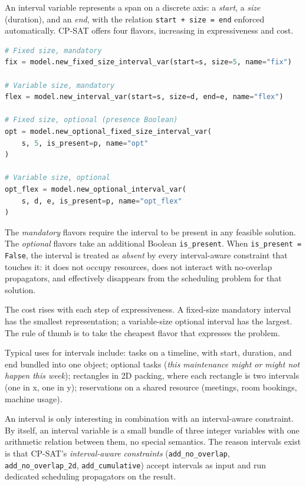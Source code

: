 An interval variable represents a span on a discrete axis: a
\emph{start}, a \emph{size} (duration), and an \emph{end}, with the
relation \lstinline!start + size = end! enforced
automatically. CP-SAT offers four flavors, increasing in expressiveness
and cost.

\begin{lstlisting}[language=Python]
# Fixed size, mandatory
fix = model.new_fixed_size_interval_var(start=s, size=5, name="fix")

# Variable size, mandatory
flex = model.new_interval_var(start=s, size=d, end=e, name="flex")

# Fixed size, optional (presence Boolean)
opt = model.new_optional_fixed_size_interval_var(
    s, 5, is_present=p, name="opt"
)

# Variable size, optional
opt_flex = model.new_optional_interval_var(
    s, d, e, is_present=p, name="opt_flex"
)
\end{lstlisting}

The \emph{mandatory} flavors require the interval to be present in any
feasible solution. The \emph{optional} flavors take an additional
Boolean \lstinline!is_present!. When
\lstinline!is_present = False!, the interval is treated
as \emph{absent} by every interval-aware constraint that touches it: it
does not occupy resources, does not interact with no-overlap
propagators, and effectively disappears from the scheduling problem for
that solution.

The cost rises with each step of expressiveness. A fixed-size mandatory
interval has the smallest representation; a variable-size optional
interval has the largest. The rule of thumb is to take the cheapest
flavor that expresses the problem.

Typical uses for intervals include: tasks on a timeline, with start,
duration, and end bundled into one object; optional tasks (\emph{this
maintenance might or might not happen this week}); rectangles in 2D
packing, where each rectangle is two intervals (one in x, one in y);
reservations on a shared resource (meetings, room bookings, machine
usage).

An interval is only interesting in combination with an interval-aware
constraint. By itself, an interval variable is a small bundle of three
integer variables with one arithmetic relation between them, no
special semantics. The reason intervals exist is that CP-SAT's
\emph{interval-aware constraints} (\lstinline!add_no_overlap!,
\lstinline!add_no_overlap_2d!,
\lstinline!add_cumulative!) accept intervals as input
and run dedicated scheduling propagators on the result.

